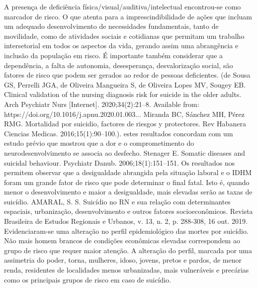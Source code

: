 A presença de deficiência física/visual/auditiva/intelectual encontrou-se como marcador de risco. O que atenta para a imprescindibilidade de ações que incluam um adequado desenvolvimento de necessidades fundamentais, tanto de movilidade, como de atividades sociais e cotidianas que permitam um trabalho intersetorial em todos os aspectos da vida, gerando assim uma abrangência e inclusão da  população em risco. É importante também considerar que a dependência, a falta de autonomia, desesperança, desvalorização social, são fatores de risco que podem ser gerados ao redor de pessoas deficientes. (de Sousa GS, Perrelli JGA, de Oliveira Mangueira S, de Oliveira Lopes MV, Sougey EB. Clinical validation of the nursing diagnosis risk for suicide in the older adults. Arch Psychiatr Nurs [Internet]. 2020;34(2):21–8. Available from: https://doi.org/10.1016/j.apnu.2020.01.003... Miranda BC, Sánchez MH, Pérez RMG. Mortalidad por suicidio, factores de riesgos y protectores. Rev Habanera Ciencias Medicas. 2016;15(1):90–100.). estes resultados concordam com um estudo prévio que mostrou que a dor e o comprometimento do neurodesenvolvimento se associa ao desfecho. Stenager E. Somatic diseases and suicidal behaviour. Psychiatr Danub. 2006;18(1):151–151. 
Os resultados nos permitem observar que a desigualdade abrangida pela situação laboral e o IDHM foram um grande fator de risco que pode determinar o final fatal. Isto é, quando menor o desenvolvimento e maior a desigualdade, mais elevadas serão as taxas de suicídio. AMARAL, S. S. Suicídio no RN e sua relação com determinantes espaciais, urbanização, desenvolvimento e outros fatores socioeconômicos. Revista Brasileira de Estudos Regionais e Urbanos, v. 13, n. 2, p. 288-308, 16 out. 2019. Evidenciaram-se uma alteração no perfil epidemiológico das mortes por suicídio. Não mais homem brancos de condições econômicas elevadas correspondem ao grupo de risco que requer maior atenção. A alteração do perfil, marcada por uma assimetria do poder, torna, mulheres, idoso, jovens, pretos e pardos, de menor renda, residentes de localidades menos urbanizadas, mais vulneráveis e precárias como os principais grupos de risco em caso de suicídio.
